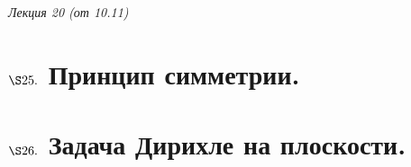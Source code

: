 \begin{flushright}
    \textit{Лекция 20 (от 10.11)}
\end{flushright}
\section{$\S 25.$ Принцип симметрии.}
\section{$\S 26.$ Задача Дирихле на плоскости.}